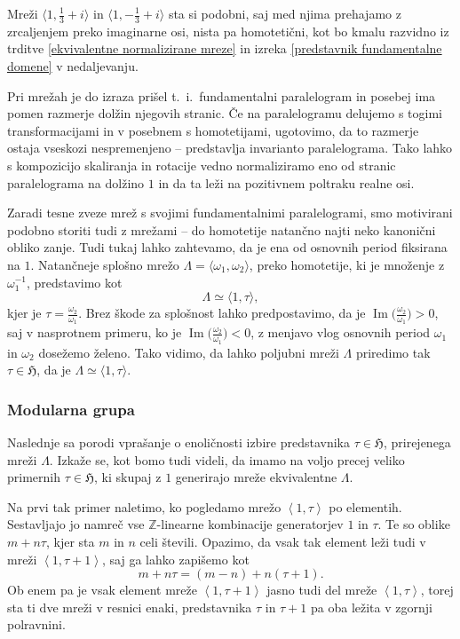 \documentclass[mat1]{fmfdelo}
\numberwithin{equation}{section}
\newcommand{\Z}{\mathbb Z}
\newcommand{\HH}{\mathfrak{H}}
\newcommand{\om}{\omega}
\newcommand{\inv}{^{-1}}
\newcommand{\htp}{\simeq}
\newcommand{\lattice}[2]{\left\langle #1, #2 \right\rangle}
\renewcommand\Im{\operatorname{Im}}%
\newcommand{\ti}{t.~i.\ }
\theoremstyle{definition}
\begin{document}
\begin{primer*}
    Mreži $\langle 1, \frac{1}{3} + i \rangle$ in $\langle 1, -\frac{1}{3} + i \rangle$ sta si podobni, saj med njima prehajamo z zrcaljenjem preko imaginarne osi, nista pa homotetični, kot bo kmalu razvidno iz trditve \ref{ekvivalentne normalizirane mreze} in izreka \ref{predstavnik fundamentalne domene} v nedaljevanju. 
\end{primer*}
Pri mrežah je do izraza prišel \ti fundamentalni paralelogram in posebej ima pomen razmerje dolžin njegovih stranic. Če na paralelogramu delujemo s togimi transformacijami in v posebnem s homotetijami, ugotovimo, da to razmerje ostaja vseskozi nespremenjeno -- predstavlja invarianto paralelograma. Tako lahko s kompozicijo skaliranja in rotacije vedno normaliziramo eno od stranic paralelograma na dolžino $1$ in da ta leži na pozitivnem poltraku realne osi.  

Zaradi tesne zveze mrež s svojimi fundamentalnimi paralelogrami, smo motivirani podobno storiti tudi z mrežami -- do homotetije natančno najti neko kanonični obliko zanje. 
Tudi tukaj lahko zahtevamo, da je ena od osnovnih period fiksirana na $1$. Natančneje splošno mrežo $\Lambda = \langle \om_1, \om_2 \rangle$, preko homotetije, ki je množenje z $\om_1\inv$, predstavimo kot
\[
    \Lambda \htp \langle 1, \tau \rangle,
\]
kjer je $\tau = \frac{\om_2}{\om_1}$. Brez škode za splošnost lahko predpostavimo, da je $\Im\big(\frac{\om_2}{\om_1}\big) > 0$, saj v nasprotnem primeru, ko je $\Im\big(\frac{\om_2}{\om_1}\big) < 0$, z menjavo vlog osnovnih period $\om_1$ in $\om_2$ dosežemo želeno. Tako vidimo, da lahko poljubni mreži $\Lambda$ priredimo tak $\tau \in \HH$, da je $\Lambda \htp \langle 1, \tau \rangle$.

\subsubsection{Modularna grupa}
Naslednje sa porodi vprašanje o enoličnosti izbire predstavnika $\tau \in \HH$, prirejenega mreži $\Lambda$. Izkaže se, kot bomo tudi videli, da imamo na voljo precej veliko primernih $\tau \in \HH$, ki skupaj z $1$ generirajo mreže ekvivalentne $\Lambda$. 

Na prvi tak primer naletimo, ko pogledamo mrežo $\lattice{1}{\tau}$ po elementih.
Sestavljajo jo namreč vse $\Z$-linearne kombinacije generatorjev $1$ in $\tau$. Te so oblike $m + n\tau$, kjer sta $m$ in $n$ celi števili. Opazimo, da vsak tak element leži tudi v mreži $\lattice{1}{\tau + 1}$, saj ga lahko zapišemo kot
\[
    m + n\tau = (m - n) + n(\tau + 1).
\] 
Ob enem pa je vsak element mreže $\lattice{1}{\tau + 1}$ jasno tudi del mreže $\lattice{1}{\tau}$, torej sta ti dve mreži v resnici enaki, predstavnika $\tau$ in $\tau + 1$ pa oba ležita v zgornji polravnini.
\end{document}

